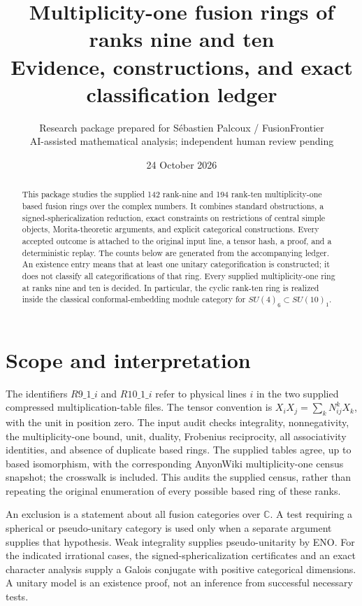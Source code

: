 \documentclass[11pt]{article}
\title{Multiplicity-one fusion rings of ranks nine and ten\\\large Evidence, constructions, and exact classification ledger}
\author{Research package prepared for S\'ebastien Palcoux / FusionFrontier\\\small AI-assisted mathematical analysis; independent human review pending}
\date{24 October 2026}
\newcommand{\C}{\mathbb C}
\theoremstyle{remark}\newtheorem{remark}[proposition]{Remark}
\begin{document}
\maketitle
\begin{abstract}
This package studies the supplied 142 rank-nine and 194 rank-ten
multiplicity-one based fusion rings over the complex numbers. It combines
standard obstructions, a signed-sphericalization reduction, exact constraints
on restrictions of central simple objects, Morita-theoretic arguments, and
explicit categorical constructions. Every accepted outcome is attached to
the original input line, a tensor hash, a proof, and a deterministic replay.
The counts below are generated from the accompanying ledger. An existence
entry means that at least one unitary categorification is constructed; it
does not classify all categorifications of that ring. Every supplied multiplicity-one ring at ranks nine and ten is decided. In particular, the cyclic rank-ten ring is realized inside the classical conformal-embedding module category for $SU(4)_6\subset SU(10)_1$.
\end{abstract}

\newpage
{\small\tableofcontents}
\newpage
\section{Scope and interpretation}
The identifiers $R9\_1\_i$ and $R10\_1\_i$ refer to physical lines $i$ in
the two supplied compressed multiplication-table files. The tensor convention
is $X_iX_j=\sum_kN_{ij}^{k}X_k$, with the unit in position zero.
The input audit checks integrality, nonnegativity, the multiplicity-one bound,
unit, duality, Frobenius reciprocity, all associativity identities, and absence
of duplicate based rings. The supplied tables agree, up to based isomorphism,
with the corresponding AnyonWiki multiplicity-one census snapshot; the
crosswalk is included. This audits the supplied census, rather than repeating
the original enumeration of every possible based ring of these ranks.

An exclusion is a statement about all fusion categories over $\C$. A test
requiring a spherical or pseudo-unitary category is used only when a separate
argument supplies that hypothesis. Weak integrality supplies pseudo-unitarity
by ENO. For the indicated irrational cases, the signed-sphericalization
certificates and an exact character analysis supply a Galois conjugate with
positive categorical dimensions. A unitary model is an existence proof,
not an inference from successful necessary tests.
\end{document}
